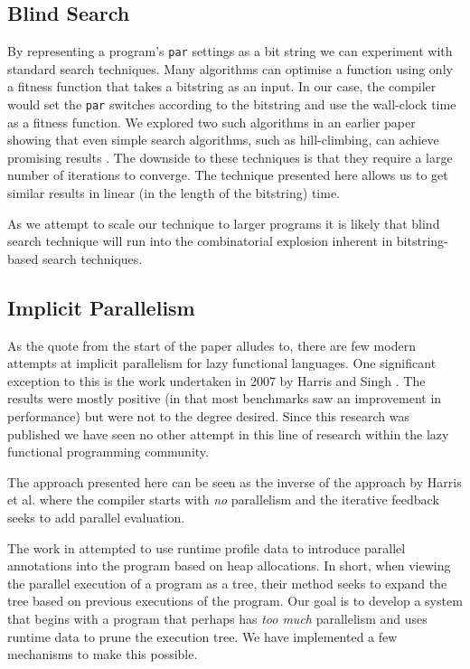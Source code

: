 \subsection*{Blind Search}

By representing a program's \verb-par- settings as a bit string we can
experiment with standard search techniques. Many algorithms can optimise a
function using only a fitness function that takes a bitstring as an input. In
our case, the compiler would set the \verb-par- switches according to the
bitstring and use the wall-clock time as a fitness function.  We explored two
such algorithms in an earlier paper showing that even simple search algorithms,
such as hill-climbing, can achieve promising results \citep{ssbse}. The downside
to these techniques is that they require a large number of iterations to
converge. The technique presented here allows us to get similar results in
linear (in the length of the bitstring) time.

As we attempt to scale our technique to larger programs it is likely that blind
search technique will run into the combinatorial explosion inherent in
bitstring-based search techniques.


\subsection*{Implicit Parallelism}

As the quote from the start of the paper alludes to, there are few modern
attempts at implicit parallelism for lazy functional languages.
One significant exception to this is the work undertaken in 2007 by Harris and
Singh \citep{feedbackImplicit}. The results were mostly positive
(in that most benchmarks saw an improvement in performance) but were not to the degree
desired. Since this research was published we have seen no other attempt in
this line of research within the lazy functional programming community.

The approach presented here can be seen as the inverse
of the approach by Harris et al. \citep{feedbackImplicit} where the compiler
starts with \emph{no} parallelism and the iterative feedback seeks to add
parallel evaluation.

The work in \citep{feedbackImplicit} attempted to use runtime profile data to introduce
parallel annotations into the program based on heap allocations. In short, when viewing
the parallel execution of a program as a tree, their method seeks to expand the tree
based on previous executions of the program. Our goal is to develop a system
that begins with a program that perhaps has \emph{too much} parallelism and
uses runtime data to prune the execution tree. We have implemented a few mechanisms
to make this possible.

